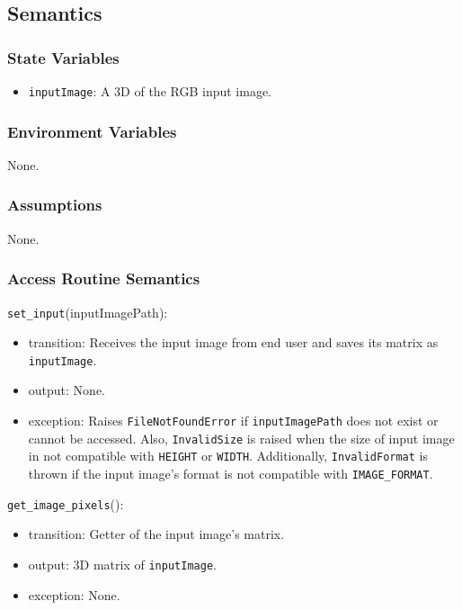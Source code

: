 \documentclass[12pt, titlepage]{article}
\def\code#1{\texttt{#1}}
\begin{document}
\subsection{Semantics}

\subsubsection{State Variables}
\begin{itemize}
  \item \code{inputImage}: A 3D of the RGB input image.
\end{itemize}

\subsubsection{Environment Variables}
None.

\subsubsection{Assumptions}
None.

\subsubsection{Access Routine Semantics}

\noindent \code{set\_input}(inputImagePath):
\begin{itemize}
  \item transition: Receives the input image from end user and saves its matrix as \code{inputImage}.
  \item output: None.
  \item exception: Raises \code{FileNotFoundError} if \code{inputImagePath} does not exist or cannot be accessed. 
  Also, \code{InvalidSize} is raised when the size of input image in not compatible with \code{HEIGHT} or 
  \code{WIDTH}. Additionally, \code{InvalidFormat} is thrown if the input image's format is 
  not compatible with \code{IMAGE\_FORMAT}.
\end{itemize}

\noindent \code{get\_image\_pixels}():
\begin{itemize}
  \item transition: Getter of the input image's matrix.
  \item output: 3D matrix of \code{inputImage}.
  \item exception: None.
\end{itemize}
\end{document}
